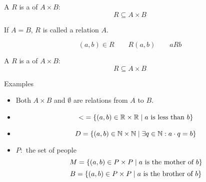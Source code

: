 
\begin{frame}{}
  \begin{definition}[关系 (Relations)]
    A  $R$ 
    is a  of $A \times B$:
    \[
      {R \subseteq A \times B}
    \]
  \end{definition}

  \pause
  \vspace{0.30cm}
  \begin{center}
    If $A = B$, $R$ is called a relation  $A$.
  \end{center}

  \pause
  \vspace{0.50cm}
  \begin{definition}[Notations]
    \[
      (a, b) \in R \qquad R(a, b) \qquad a R b
    \]
  \end{definition}
\end{frame}

\begin{frame}{}
  \begin{definition}[Relations]
    A  $R$ 
    is a  of $A \times B$:
    \[
      {R \subseteq A \times B}
    \]
  \end{definition}

  \begin{exampleblock}{Examples}
    \pause
    \begin{itemize}[<+->]
      \item Both $A \times B$ and $\emptyset$ are relations from $A$ to $B$.
      \item
        \[
          <\; = \{(a, b) \in \mathbb{R} \times \mathbb{R} \mid a \text{ is less than } b\}
        \]
      \item
        \[
          D = \{(a, b) \in \mathbb{N} \times \mathbb{N} \mid \exists q \in \mathbb{N}: a \cdot q = b\}
        \]
      \item $P:$ the set of people
        \[
          M = \{(a, b) \in P \times P \mid a \text{ is the mother of } b\}
        \]
        \[
          B = \{(a, b) \in P \times P \mid a \text{ is the brother of } b\}
        \]
    \end{itemize}
  \end{exampleblock}
\end{frame}

